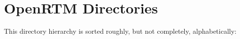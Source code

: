 \section{Open\-RTM Directories}
This directory hierarchy is sorted roughly, but not completely, alphabetically:\begin{CompactList}
\item {}
\begin{CompactList}
\item {}
\end{CompactList}
\end{CompactList}
